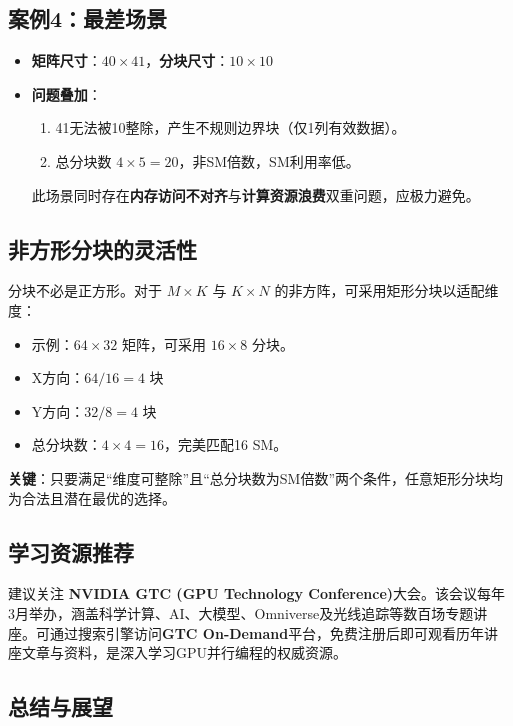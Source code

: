 \subsection{案例4：最差场景}
\begin{itemize}
    \item \textbf{矩阵尺寸}：$40 \times 41$，\textbf{分块尺寸}：$10 \times 10$
    \item \textbf{问题叠加}：
    \begin{enumerate}
        \item 41无法被10整除，产生不规则边界块（仅1列有效数据）。
        \item 总分块数 $4 \times 5 = 20$，非SM倍数，SM利用率低。
    \end{enumerate}
    此场景同时存在\textbf{内存访问不对齐}与\textbf{计算资源浪费}双重问题，应极力避免。
\end{itemize}

\subsection{非方形分块的灵活性}

分块不必是正方形。对于 $M \times K$ 与 $K \times N$ 的非方阵，可采用矩形分块以适配维度：
\begin{itemize}
    \item 示例：$64 \times 32$ 矩阵，可采用 $16 \times 8$ 分块。
    \item X方向：$64 / 16 = 4$ 块
    \item Y方向：$32 / 8 = 4$ 块
    \item 总分块数：$4 \times 4 = 16$，完美匹配16 SM。
\end{itemize}
\noindent \textbf{关键}：只要满足“维度可整除”且“总分块数为SM倍数”两个条件，任意矩形分块均为合法且潜在最优的选择。

\subsection{学习资源推荐}

建议关注 \textbf{NVIDIA GTC (GPU Technology Conference)}大会。该会议每年
3月举办，涵盖科学计算、AI、大模型、Omniverse及光线追踪等数百场专题讲座。可通过搜索引擎访问\textbf{GTC On-Demand}平台，免费注册后即可观看历年讲座文章与资料，是深入学习GPU并行编程的权威资源。

\subsection{总结与展望}

